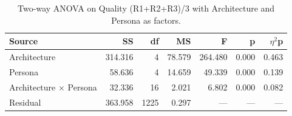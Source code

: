 \begin{table}[htbp]
\centering
\caption{Two-way ANOVA on Quality (R1+R2+R3)/3 with Architecture and Persona as factors.}
\label{tab:anova-quality}
\begin{tabular}{lrrrrrr}
\toprule
Source & SS & df & MS & F & p & $\eta$$^2$p \\
\midrule
Architecture & 314.316 & 4 & 78.579 & 264.480 & 0.000 & 0.463 \\
Persona & 58.636 & 4 & 14.659 & 49.339 & 0.000 & 0.139 \\
Architecture $\times$ Persona & 32.336 & 16 & 2.021 & 6.802 & 0.000 & 0.082 \\
Residual & 363.958 & 1225 & 0.297 & --- & --- & --- \\
\bottomrule
\end{tabular}
\end{table}
